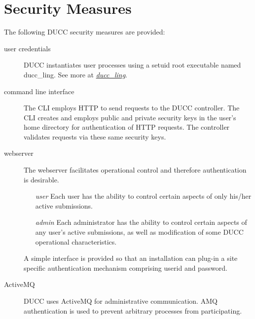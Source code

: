     
    \section{Security Measures}
    The following DUCC security measures are provided:

    \begin{description}
    \item[user credentials] DUCC instantiates user processes using a setuid root executable named ducc\_ling.
    See more at \hyperref[sec:duccling.security]{\em ducc\_ling}.
    \item[command line interface] The CLI employs HTTP to send requests
    to the DUCC controller.  The CLI creates and employs public and private
    security keys in the user's home directory for authentication of HTTP
    requests.  The controller validates requests via these same security keys.
    \item[webserver] The webserver facilitates operational control and
    therefore authentication is desirable. 
    \begin{itemize}
    \item[\textit{user}] Each user has the ability to control certain aspects of
    only his/her active submissions.
    \item[\textit{admin}] Each administrator has the ability to control certain
    aspects of any user's active submissions, as well as modification of some
    DUCC operational characteristics.
    \end{itemize}
    A simple interface is provided so
    that an installation can plug-in a site specific authentication mechanism
    comprising userid and password.
    \item[ActiveMQ] DUCC uses ActiveMQ for administrative communication.
    AMQ authentication is used to prevent arbitrary processes from participating.
    \end{description}
    
